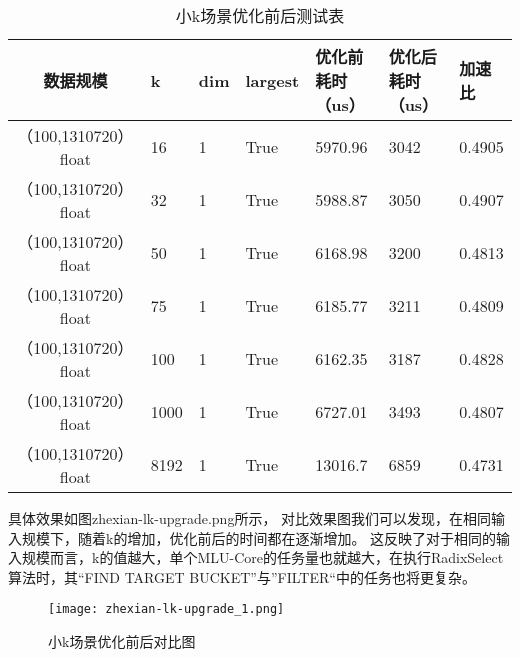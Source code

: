 \begin{table}
    \centering
    \caption{小k场景优化前后测试表}
    \label{tab:bench_littlek_upgrade}
    \begin{tabular}{cllllll}
        \toprule
        数据规模       &k  & dim  & largest & 优化前耗时（us）    & 优化后耗时（us） &加速比\\
        \midrule
        （100,1310720） float&16&  1     & True      & 5970.96 & 3042 &  0.4905\\
        （100,1310720） float&32&  1     & True      & 5988.87 & 3050 &  0.4907\\
        （100,1310720） float&50&  1     & True      & 6168.98 & 3200 &  0.4813 \\
        （100,1310720） float&75&  1     & True      & 6185.77 & 3211 &  0.4809 \\
        （100,1310720） float&100&  1     & True      & 6162.35& 3187 &  0.4828 \\
        （100,1310720） float&1000&  1     & True      & 6727.01 & 3493 & 0.4807 \\
        （100,1310720） float&8192&  1     & True      & 13016.7 & 6859 & 0.4731 \\
        
        \bottomrule
    \end{tabular}
    \end{table}
具体效果如图{zhexian-lk-upgrade.png}所示，
对比效果图我们可以发现，在相同输入规模下，随着k的增加，优化前后的时间都在逐渐增加。
这反映了对于相同的输入规模而言，k的值越大，单个MLU-Core的任务量也就越大，在执行RadixSelect
算法时，其“FIND TARGET BUCKET”与”FILTER“中的任务也将更复杂。

\begin{figure}[ht]
        \centering
        \texttt{[image: zhexian-lk-upgrade\_1.png]}
        \caption{小k场景优化前后对比图}
        \label{fig:bench_littlek_upgrade_zhexian}
    \end{figure}
    

